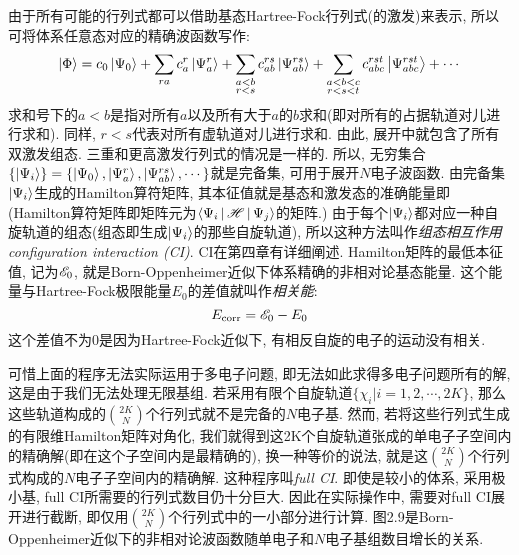 由于所有可能的行列式都可以借助基态Hartree-Fock行列式(的激发)来表示, 所以可将体系任意态对应的精确波函数写作:
\begin{equation}
\Ket{\Phi}=c_0\Ket{\Psi_0}+\sum_{ra}c_a^r\Ket{\Psi_a^r}+\sum_{\substack{a<b\\r<s}}c_{ab}^{rs}\Ket{\Psi_{ab}^{rs}}+\sum_{\substack{a<b<c\\r<s<t}}c_{abc}^{rst}\Ket{\Psi_{abc}^{rst}}+\cdots
\end{equation}
求和号下的$a<b$是指对所有$a$以及所有大于$a$的$b$求和(即对所有的占据轨道对儿进行求和). 同样, $r<s$代表对所有虚轨道对儿进行求和. 由此, 展开中就包含了所有双激发组态. 三重和更高激发行列式的情况是一样的. 所以, 无穷集合$\{\Ket{\Psi_i} \}=\{\Ket{\Psi_0}, \Ket{\Psi_a^r}, \Ket{\Psi_{ab}^{rs}}, \cdots \}$就是完备集, 可用于展开$N$电子波函数. 由完备集$\Ket{\Psi_i}$生成的Hamilton算符矩阵, 其本征值就是基态和激发态的准确能量即(Hamilton算符矩阵即矩阵元为$\Braket{\Psi_i|\mathscr{H}|\Psi_j
}$的矩阵.) 由于每个$\Ket{\Psi_i}$都对应一种自旋轨道的组态(组态即生成$\Ket{\Psi_i}$的那些自旋轨道), 所以这种方法叫作\emph{组态相互作用configuration interaction ({CI\rm})}. CI在第四章有详细阐述. Hamilton矩阵的最低本征值, 记为$\mathscr{E}_0$, 就是Born-Oppenheimer近似下体系精确的非相对论基态能量. 这个能量与Hartree-Fock极限能量$E_0$的差值就叫作\emph{相关能}:
\begin{equation}
E_{\mathrm{corr}}=\mathscr{E}_0-E_0
\end{equation} 
这个差值不为0是因为Hartree-Fock近似下, 有相反自旋的电子的运动没有相关.

可惜上面的程序无法实际运用于多电子问题, 即无法如此求得多电子问题所有的解, 这是由于我们无法处理无限基组. 若采用有限个自旋轨道$\{\chi_i|i=1,2,\cdots,2K \}$, 那么这些轨道构成的$\binom{2K}{N}$个行列式就不是完备的$N$电子基. 然而, 若将这些行列式生成的有限维Hamilton矩阵对角化, 我们就得到这2K个自旋轨道张成的单电子子空间内的精确解(即在这个子空间内是最精确的), 换一种等价的说法, 就是这$\binom{2K}{N}$个行列式构成的$N$电子子空间内的精确解. 这种程序叫\emph{full CI}. 即使是较小的体系, 采用极小基, full CI所需要的行列式数目仍十分巨大. 因此在实际操作中, 需要对full CI展开进行截断, 即仅用$\binom{2K}{N}$个行列式中的一小部分进行计算. 图2.9是Born-Oppenheimer近似下的非相对论波函数随单电子和$N$电子基组数目增长的关系.


